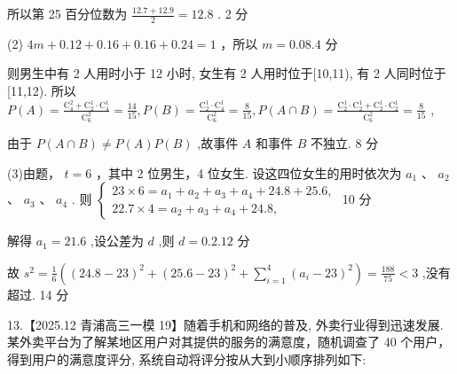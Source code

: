 \documentclass[10pt]{article}
\begin{document}
所以第 25 百分位数为 \(\frac{{12.7} + {12.9}}{2} = {12.8}\) . 2 分

(2) \({4m} + {0.12} + {0.16} + {0.16} + {0.24} = 1\) ，所以 \(m = {0.08}.4\) 分

则男生中有 2 人用时小于 12 小时, 女生有 2 人用时位于[10,11), 有 2 人同时位于[11,12). 所以 \(P\left( A\right)  = \frac{{\mathrm{C}}_{4}^{2} + {\mathrm{C}}_{2}^{1} \cdot  {\mathrm{C}}_{4}^{1}}{{\mathrm{C}}_{6}^{2}} = \frac{14}{15},P\left( B\right)  = \frac{{\mathrm{C}}_{2}^{1} \cdot  {\mathrm{C}}_{4}^{1}}{{\mathrm{C}}_{6}^{2}} = \frac{8}{15},P\left( {A \cap  B}\right)  = \frac{{\mathrm{C}}_{2}^{1} \cdot  {\mathrm{C}}_{2}^{1} + {\mathrm{C}}_{2}^{1} \cdot  {\mathrm{C}}_{2}^{1}}{{\mathrm{C}}_{6}^{2}} = \frac{8}{15}\) ,

由于 \(P\left( {A \cap  B}\right)  \neq  P\left( A\right) P\left( B\right)\) ,故事件 \(A\) 和事件 \(B\) 不独立. 8 分

(3)由题， \(t = 6\) ，其中 2 位男生，4 位女生. 设这四位女生的用时依次为 \({a}_{1}\) 、 \({a}_{2}\) 、 \({a}_{3}\) 、 \({a}_{4}\) . 则 \(\left\{  \begin{array}{l} {23} \times  6 = {a}_{1} + {a}_{2} + {a}_{3} + {a}_{4} + {24.8} + {25.6}, \\  {22.7} \times  4 = {a}_{2} + {a}_{3} + {a}_{4} + {24.8}, \end{array}\right.\) 10 分

解得 \({a}_{1} = {21.6}\) ,设公差为 \(d\) ,则 \(d = {0.2}.{12}\) 分

故 \({s}^{2} = \frac{1}{6}\left( {{\left( {24.8} - {23}\right) }^{2} + {\left( {25.6} - {23}\right) }^{2} + \mathop{\sum }\limits_{{i = 1}}^{4}{\left( {a}_{i} - {23}\right) }^{2}}\right)  = \frac{188}{75} < 3\) ,没有超过. 14 分

13.【2025.12 青浦高三一模 19】随着手机和网络的普及, 外卖行业得到迅速发展. 某外卖平台为了解某地区用户对其提供的服务的满意度，随机调查了 40 个用户，得到用户的满意度评分, 系统自动将评分按从大到小顺序排列如下:

\begin{center}
\end{center}
\end{document}
